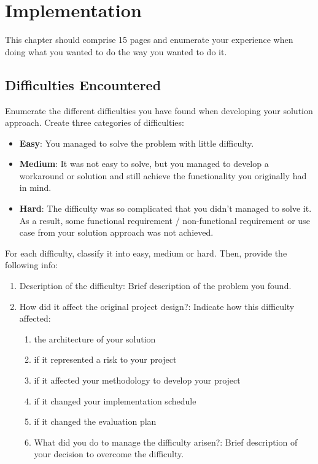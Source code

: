\chapter{Implementation}
\label{chap:imp}
This chapter should comprise 15 pages and enumerate your experience when doing what you wanted to do the way you wanted to do it.

\section{Difficulties Encountered}
Enumerate the different difficulties you have found when developing your solution approach. Create three categories of difficulties:
\begin{itemize}
    \item \textbf{Easy}: You managed to solve the problem with little difficulty.
    \item \textbf{Medium}: It was not easy to solve, but you managed to develop a workaround or solution and still achieve the functionality you originally had in mind.
    \item \textbf{Hard}: The difficulty was so complicated that you didn’t managed to solve it. As a result, some functional requirement / non-functional requirement or use case from your solution approach was not achieved.
\end{itemize}

For each difficulty, classify it into easy, medium or hard. Then, provide the following info:
\begin{enumerate}
    \item Description of the difficulty: Brief description of the problem you found.
    \item How did it affect the original project design?: Indicate how this difficulty affected:
    \begin{enumerate}
        \item the architecture of your solution
        \item if it represented a risk to your project
        \item if it affected your methodology to develop your project
        \item if it changed your implementation schedule
        \item if it changed the evaluation plan
    \item What did you do to manage the difficulty arisen?: Brief description of your decision to overcome the difficulty.
    \end{enumerate}
\end{enumerate}

